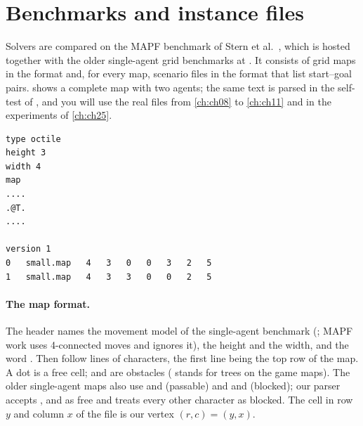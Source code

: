 \section{Benchmarks and instance files}
\label{sec:ch07-benchmarks}

Solvers are compared on the MAPF benchmark of Stern et
al.~\cite{stern2019mapf}, which is hosted together
with the older single-agent grid benchmarks at . It
consists of grid maps in the  format and, for every map, scenario
files in the  format that list start--goal pairs.
 shows a complete map with two agents; the same text is
parsed in the self-test of , and you will use the real
files from \cref{ch:ch08} to \cref{ch:ch11} and in the experiments of
\cref{ch:ch25}.

\begin{lstlisting}[language={},numbers=none,caption={A complete \code{.map} file (top: four header lines, then one text row per grid row) and a \code{.scen} file with two agents (bottom). The fields of a scenario line are separated by tabs; spaces are shown here.},label={lst:ch07-files}]
type octile
height 3
width 4
map
....
.@T.
....

version 1
0   small.map   4   3   0   0   3   2   5
1   small.map   4   3   3   0   0   2   5
\end{lstlisting}

\paragraph{The map format.}
The header names the movement model of the single-agent benchmark
(; MAPF work uses 4-connected moves and ignores it), the height
and the width, and the word . Then follow  lines of
 characters, the first line being the top row of the map. A dot
is a free cell;  and  are obstacles ( stands for
trees on the game maps). The older single-agent maps also use  and
 (passable) and  and  (blocked); our parser accepts
,  and  as free and treats every other character as
blocked. The cell in row $y$ and
column $x$ of the file is our vertex $(r, c) = (y, x)$.

